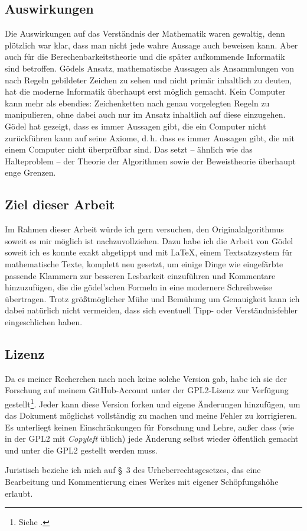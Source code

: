 \subsection*{Auswirkungen}

Die Auswirkungen auf das Verständnis der Mathematik waren gewaltig, denn plötzlich war klar,
dass man nicht jede wahre Aussage auch beweisen kann. Aber auch für die Berechenbarkeitstheorie
und die später aufkommende Informatik sind betroffen. Gödels Ansatz, mathematische
Aussagen als Ansammlungen von nach Regeln gebildeter Zeichen zu sehen und nicht primär
inhaltlich zu deuten, hat die moderne Informatik überhaupt erst möglich gemacht.
Kein Computer kann mehr als ebendies: Zeichenketten nach genau vorgelegten Regeln
zu manipulieren, ohne dabei auch nur im Ansatz inhaltlich auf diese einzugehen. Gödel hat
gezeigt, dass es immer Aussagen gibt, die ein Computer nicht zurückführen kann auf
seine Axiome, d.\,h. dass es immer Aussagen gibt, die mit einem Computer nicht überprüfbar sind.
Das setzt -- ähnlich wie das Halteproblem -- der Theorie der Algorithmen sowie
der Beweistheorie überhaupt enge Grenzen.

\subsection*{Ziel dieser Arbeit}

Im Rahmen dieser Arbeit würde ich gern versuchen, den Originalalgorithmus soweit
es mir möglich ist nachzuvollziehen. Dazu habe ich die Arbeit von Gödel soweit ich
es konnte exakt abgetippt und mit \LaTeX, einem Textsatzsystem für mathematische
Texte, komplett neu gesetzt, um einige Dinge wie eingefärbte passende Klammern zur besseren
Lesbarkeit einzuführen und Kommentare hinzuzufügen, die die gödel'schen Formeln in eine modernere
Schreibweise übertragen. Trotz größtmöglicher Mühe und Bemühung um Genauigkeit
kann ich dabei natürlich nicht vermeiden, dass sich eventuell Tipp- oder Verständnisfehler
eingeschlichen haben.

\subsection*{Lizenz}

Da es meiner Recherchen nach noch keine solche Version gab, habe ich sie der
Forschung auf meinem GitHub-Account unter der GPL2-Lizenz zur Verfügung
gestellt\footnote{Siehe .}.
Jeder kann diese Version forken und eigene Änderungen hinzufügen, um das
Dokument möglichst vollständig zu machen und meine Fehler zu korrigieren.
Es unterliegt keinen Einschränkungen für Forschung und Lehre, außer dass
(wie in der GPL2 mit \textit{Copyleft} üblich) jede Änderung selbst wieder
öffentlich gemacht und unter die GPL2 gestellt werden muss.

Juristisch beziehe ich mich auf §~3 des Urheberrechtsgesetzes, das eine
Bearbeitung und Kommentierung eines Werkes mit eigener Schöpfungshöhe
erlaubt.

\newpage

\printbibliography

\newpage
{}
\setcounter{footnote}{0}
\setcounter{page}{173}
\let\thefootnote\originalthefootnote
